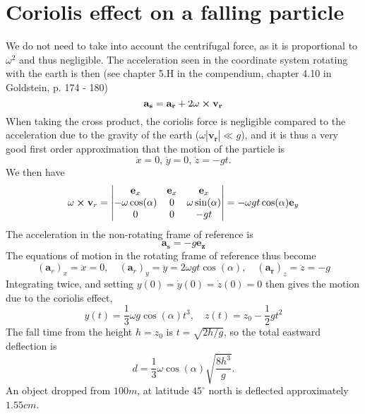 \documentclass{article}
\begin{document}
    \section{Coriolis effect on a falling particle}
    We do not need to take into account the centrifugal force, as it is proportional to $\omega^2$ and thus negligible. The acceleration seen in the coordinate system rotating with the earth is then (see chapter 5.H in the compendium, chapter 4.10 in Goldstein, p. 174 - 180)
    \begin{equation*}
        \mathbf{a_s} = \mathbf{a_r} + 2 \mathbf{\omega} \cross \mathbf{v_r}
    \end{equation*}
    When taking the cross product, the coriolis force is negligible compared to the acceleration due to the gravity of the earth ($\omega |\mathbf{v_r}| \ll g $), and it is thus a very good first order approximation that the motion of the particle is
    \begin{equation*}
        \dot x = 0, \, \dot y = 0, \, \dot z = -gt.
    \end{equation*}
    We then have
    \begin{equation*}
        \omega \cross \mathbf{v}_r= 
        \begin{vmatrix}
            \mathbf{e}_x & \mathbf{e}_x & \mathbf{e}_x \\
            -\omega \cos(\alpha) & 0 & \omega \sin(\alpha) \\
            0 & 0 & -g t
        \end{vmatrix}
        = -\omega g t \cos(\alpha) \mathbf{e}_y
    \end{equation*}
    The acceleration in the non-rotating frame of reference is
    \begin{equation*}
        \mathbf{a_s} = -g \mathbf{e_z}
    \end{equation*}
    The equations of motion in the rotating frame of reference thus become
    \begin{equation*}
        (\mathbf{a}_r)_x = \ddot x = 0, \quad (\mathbf{a}_r)_y = \ddot y = 2 \omega g t \cos(\alpha), \quad (\mathbf{a_r})_z = \ddot z = -g  
    \end{equation*}
    Integrating twice, and setting $y(0) = \dot y(0) = \dot z(0) = 0$ then gives the motion due to the coriolis effect,
    \begin{equation*}
        y(t) = \frac{1}{3}\omega g \cos(\alpha) t^3, \quad z(t) = z_0 - \frac{1}{2}g t^2
    \end{equation*}
    The fall time from the height $h = z_0$ is $t = \sqrt{2h / g}$, so the total eastward deflection is
    \begin{equation*}
        d = \frac{1}{3} \omega \cos(\alpha)\sqrt{\frac{8 h^3}{g}}.
    \end{equation*}
    An object dropped from $100 \si{m}$, at latitude $45^\circ $ north is deflected approximately $1.55 \si{cm}$. 
\end{document}

